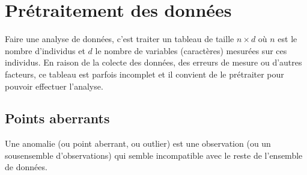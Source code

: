 \documentclass[letterpaper,10pt,english]{jupyterBook}
\begin{document}
\section{Pré\sphinxhyphen{}traitement des données}
\label{\detokenize{statsdescriptives:pre-traitement-des-donnees}}
\sphinxAtStartPar
Faire une analyse de données, c’est traiter un tableau de taille \(n\times d\) où \(n\) est le nombre d’individus et \(d\) le nombre de variables (caractères) mesurées sur ces individus. En raison de la colecte des données, des erreurs de mesure ou d’autres facteurs, ce tableau est parfois incomplet et il convient de le prétraiter pour pouvoir effectuer l’analyse.


\subsection{Points aberrants}
\label{\detokenize{statsdescriptives:points-aberrants}}
\sphinxAtStartPar
Une anomalie (ou point aberrant, ou outlier) est une observation (ou un sous\sphinxhyphen{}ensemble d’observations) qui semble incompatible avec le reste de l’ensemble de données.
\end{document}
